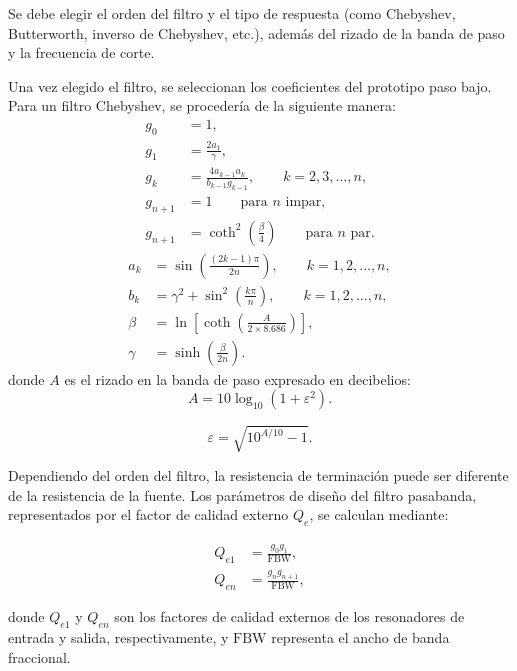 Se debe elegir el orden del filtro y el tipo de respuesta (como Chebyshev, Butterworth, inverso de Chebyshev, etc.), además del rizado de la banda de paso y la frecuencia de corte.

Una vez elegido el filtro, se seleccionan los coeficientes del prototipo paso bajo. Para un filtro Chebyshev, se procedería de la siguiente manera:
\begin{align}
g_0 &= 1, \\
g_1 &= \frac{2a_1}{\gamma}, \\
g_k &= \frac{4a_{k-1}a_k}{b_{k-1}g_{k-1}}, \qquad k=2,3,\ldots,n, \\
g_{n+1} &= 1 \qquad \text{para } n \text{ impar}, \\
g_{n+1} &= \coth^2\left(\frac{\beta}{4}\right) \qquad \text{para } n \text{ par}.
\end{align}
\begin{align}
a_k &= \sin\left(\frac{(2k-1)\pi}{2n}\right), \qquad k=1,2,\ldots,n, \\
b_k &= \gamma^2+\sin^2\left(\frac{k\pi}{n}\right), \qquad k=1,2,\ldots,n, \\
\beta &= \ln\left[\coth\left(\frac{A}{2\times 8.686}\right)\right], \\
\gamma &= \sinh\left(\frac{\beta}{2n}\right).
\end{align}
donde $A$ es el rizado en la banda de paso expresado en decibelios:
\begin{equation}
A = 10\log_{10}\left(1+\varepsilon^2\right).
\end{equation}

\begin{equation}
\varepsilon = \sqrt{10^{A/10}-1}.
\end{equation}

Dependiendo del orden del filtro, la resistencia de terminación puede ser diferente de la resistencia de la fuente. Los parámetros de diseño del filtro pasabanda, representados por el factor de calidad externo $Q_e$, se calculan mediante:

\begin{align}
Q_{e1} &= \frac{g_0g_1}{\mathrm{FBW}}, \\
Q_{en} &= \frac{g_ng_{n+1}}{\mathrm{FBW}},
\end{align}

donde $Q_{e1}$ y $Q_{en}$ son los factores de calidad externos de los resonadores de entrada y salida, respectivamente, y $\mathrm{FBW}$ representa el ancho de banda fraccional.

